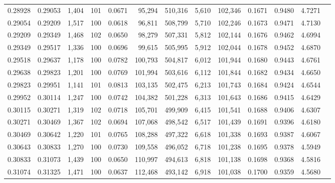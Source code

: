 \begin{tabular}{rrrrrrrrrrrrr}
0.28928 & 0.29053 & 1,404 & 101 &                                     0.0671 &  95,294 & 510,316 &   5,610 & 102,346 & 0.1671 & 0.9480 & 4.7271 \\
0.29054 & 0.29209 & 1,517 & 100 &                                     0.0618 &  96,811 & 508,799 &   5,710 & 102,246 & 0.1673 & 0.9471 & 4.7130 \\
0.29209 & 0.29349 & 1,468 & 102 &                                     0.0650 &  98,279 & 507,331 &   5,812 & 102,144 & 0.1676 & 0.9462 & 4.6994 \\
0.29349 & 0.29517 & 1,336 & 100 &                                     0.0696 &  99,615 & 505,995 &   5,912 & 102,044 & 0.1678 & 0.9452 & 4.6870 \\
0.29518 & 0.29637 & 1,178 & 100 &                                     0.0782 & 100,793 & 504,817 &   6,012 & 101,944 & 0.1680 & 0.9443 & 4.6761 \\
0.29638 & 0.29823 & 1,201 & 100 &                                     0.0769 & 101,994 & 503,616 &   6,112 & 101,844 & 0.1682 & 0.9434 & 4.6650 \\
0.29823 & 0.29951 & 1,141 & 101 &                                     0.0813 & 103,135 & 502,475 &   6,213 & 101,743 & 0.1684 & 0.9424 & 4.6544 \\
0.29952 & 0.30114 & 1,247 & 100 &                                     0.0742 & 104,382 & 501,228 &   6,313 & 101,643 & 0.1686 & 0.9415 & 4.6429 \\
0.30115 & 0.30271 & 1,319 & 102 &                                     0.0718 & 105,701 & 499,909 &   6,415 & 101,541 & 0.1688 & 0.9406 & 4.6307 \\
0.30271 & 0.30469 & 1,367 & 102 &                                     0.0694 & 107,068 & 498,542 &   6,517 & 101,439 & 0.1691 & 0.9396 & 4.6180 \\
0.30469 & 0.30642 & 1,220 & 101 &                                     0.0765 & 108,288 & 497,322 &   6,618 & 101,338 & 0.1693 & 0.9387 & 4.6067 \\
0.30643 & 0.30833 & 1,270 & 100 &                                     0.0730 & 109,558 & 496,052 &   6,718 & 101,238 & 0.1695 & 0.9378 & 4.5949 \\
0.30833 & 0.31073 & 1,439 & 100 &                                     0.0650 & 110,997 & 494,613 &   6,818 & 101,138 & 0.1698 & 0.9368 & 4.5816 \\
0.31074 & 0.31325 & 1,471 & 100 &                                     0.0637 & 112,468 & 493,142 &   6,918 & 101,038 & 0.1700 & 0.9359 & 4.5680 \\

\end{tabular}
